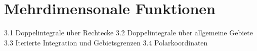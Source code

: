\chapter{Mehrdimensonale Funktionen}
3.1 Doppelintegrale über Rechtecke
3.2 Doppelintegrale über allgemeine Gebiete
3.3 Iterierte Integration und Gebietsgrenzen
3.4 Polarkoordinaten